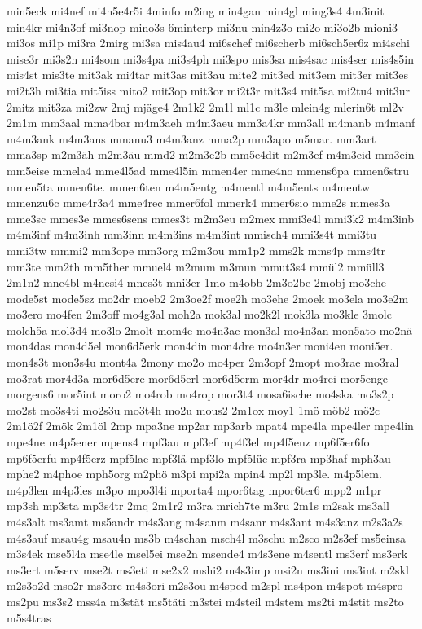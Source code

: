 {min5eck
mi4nef
mi4n5e4r5i
4minfo
m2ing
min4gan
min4gl
ming3s4
4m3init
min4kr
mi4n3of
mi3nop
mino3s
6minterp
mi3nu
min4z3o
mi2o
mi3o2b
mioni3
mi3os
mi1p
mi3ra
2mirg
mi3sa
mis4au4
mi6schef
mi6scherb
mi6sch5er6z
mi4schi
mise3r
mi3s2n
mi4som
mi3s4pa
mi3s4ph
mi3spo
mis3sa
mis4sac
mis4ser
mis4s5in
mis4st
mis3te
mit3ak
mi4tar
mit3as
mit3au
mite2
mit3ed
mit3em
mit3er
mit3es
mi2t3h
mi3tia
mit5iss
mito2
mit3op
mit3or
mi2t3r
mit3s4
mit5sa
mi2tu4
mit3ur
2mitz
mit3za
mi2zw
2mj
mjäge4
2m1k2
2m1l
ml1c
m3le
mlein4g
mlerin6t
ml2v
2m1m
mm3aal
mma4bar
m4m3aeh
m4m3aeu
mm3a4kr
mm3all
m4manb
m4manf
m4m3ank
m4m3ans
mmanu3
m4m3anz
mma2p
mm3apo
m5mar.
mm3art
mma3sp
m2m3äh
m2m3äu
mmd2
m2m3e2b
mm5e4dit
m2m3ef
m4m3eid
mm3ein
mm5eise
mmela4
mme4l5ad
mme4l5in
mmen4er
mme4no
mmens6pa
mmen6stru
mmen5ta
mmen6te.
mmen6ten
m4m5entg
m4mentl
m4m5ents
m4mentw
mmenzu6c
mme4r3a4
mme4rec
mmer6fol
mmerk4
mmer6sio
mme2s
mmes3a
mme3sc
mmes3e
mmes6sens
mmes3t
m2m3eu
m2mex
mmi3e4l
mmi3k2
m4m3inb
m4m3inf
m4m3inh
mm3inn
m4m3ins
m4m3int
mmisch4
mmi3s4t
mmi3tu
mmi3tw
mmmi2
mm3ope
mm3org
m2m3ou
mm1p2
mms2k
mms4p
mms4tr
mm3te
mm2th
mm5ther
mmuel4
m2mum
m3mun
mmut3s4
mmül2
mmüll3
2m1n2
mne4bl
m4nesi4
mnes3t
mni3er
1mo
m4obb
2m3o2be
2mobj
mo3che
mode5st
mode5sz
mo2dr
moeb2
2m3oe2f
moe2h
mo3ehe
2moek
mo3ela
mo3e2m
mo3ero
mo4fen
2m3off
mo4g3al
moh2a
mok3al
mo2k2l
mok3la
mo3kle
3molc
molch5a
mol3d4
mo3lo
2molt
mom4e
mo4n3ae
mon3al
mo4n3an
mon5ato
mo2nä
mon4das
mon4d5el
mon6d5erk
mon4din
mon4dre
mo4n3er
moni4en
moni5er.
mon4s3t
mon3s4u
mont4a
2mony
mo2o
mo4per
2m3opf
2mopt
mo3rae
mo3ral
mo3rat
mor4d3a
mor6d5ere
mor6d5erl
mor6d5erm
mor4dr
mo4rei
mor5enge
morgens6
mor5int
moro2
mo4rob
mo4rop
mor3t4
mosa6ische
mo4ska
mo3s2p
mo2st
mo3s4ti
mo2s3u
mo3t4h
mo2u
mous2
2m1ox
moy1
1mö
möb2
mö2c
2m1ö2f
2mök
2m1öl
2mp
mpa3ne
mp2ar
mp3arb
mpat4
mpe4la
mpe4ler
mpe4lin
mpe4ne
m4p5ener
mpens4
mpf3au
mpf3ef
mp4f3el
mp4f5enz
mp6f5er6fo
mp6f5erfu
mp4f5erz
mpf5lae
mpf3lä
mpf3lo
mpf5lüc
mpf3ra
mp3haf
mph3au
mphe2
m4phoe
mph5org
m2phö
m3pi
mpi2a
mpin4
mp2l
mp3le.
m4p5lem.
m4p3len
m4p3les
m3po
mpo3l4i
mporta4
mpor6tag
mpor6ter6
mpp2
m1pr
mp3sh
mp3sta
mp3s4tr
2mq
2m1r2
m3ra
mrich7te
m3ru
2m1s
m2sak
ms3all
m4s3alt
ms3amt
ms5andr
m4s3ang
m4sanm
m4sanr
m4s3ant
m4s3anz
m2s3a2s
m4s3auf
msau4g
msau4n
ms3b
m4schan
msch4l
m3schu
m2sco
m2s3ef
ms5einsa
m3s4ek
mse5l4a
mse4le
msel5ei
mse2n
msende4
m4s3ene
m4sentl
ms3erf
ms3erk
ms3ert
m5serv
mse2t
ms3eti
mse2x2
mshi2
m4s3imp
msi2n
ms3ini
ms3int
m2skl
m2s3o2d
mso2r
ms3orc
m4s3ori
m2s3ou
m4sped
m2spl
ms4pon
m4spot
m4spro
ms2pu
ms3s2
mss4a
m3stät
ms5täti
m3stei
m4steil
m4stem
ms2ti
m4stit
ms2to
m5s4tras
}
